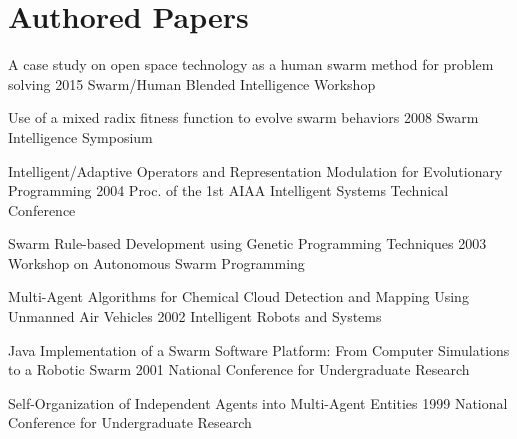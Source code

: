 \documentclass{cv_style}
\begin{document}

	\section{Authored Papers}
		\begin{etaremune}			
			\item \paper
				{A case study on open space technology as a human swarm method for problem solving}
				{2015 Swarm/Human Blended Intelligence Workshop}

			\item \paper
				{Use of a mixed radix fitness function to evolve swarm behaviors}
				{2008 Swarm Intelligence Symposium}

			\item \paper
				{Intelligent/Adaptive Operators and Representation Modulation for Evolutionary Programming}
				{2004 Proc. of the 1st AIAA Intelligent Systems Technical Conference}
			
			\item \paper
				{Swarm Rule-based Development using Genetic Programming Techniques}
				{2003 Workshop on Autonomous Swarm Programming}

			\item \paper
				{Multi-Agent Algorithms for Chemical Cloud Detection and Mapping Using Unmanned Air Vehicles}
				{2002 Intelligent Robots and Systems}

			\item \paper
				{Java Implementation of a Swarm Software Platform: From Computer Simulations to a Robotic Swarm}
				{2001 National Conference for Undergraduate Research}

			\item \paper
				{Self-Organization of Independent Agents into Multi-Agent Entities}
				{1999 National Conference for Undergraduate Research}
		\end{etaremune}
\end{document}
